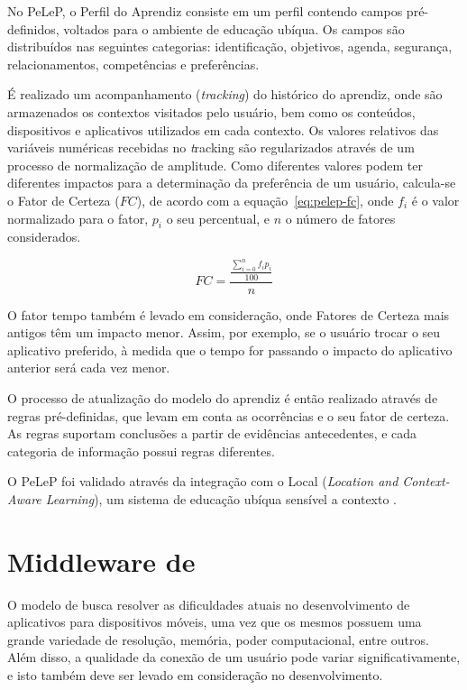 No PeLeP, o Perfil do Aprendiz consiste em um perfil contendo campos pré-definidos, voltados para o ambiente de educação ubíqua. Os campos são distribuídos nas seguintes categorias: identificação, objetivos, agenda, segurança, relacionamentos, competências e preferências. 

É realizado um acompanhamento ({\em tracking}) do histórico do aprendiz, onde são armazenados os contextos visitados pelo usuário, bem como os conteúdos, dispositivos e aplicativos utilizados em cada contexto. Os valores relativos das variáveis numéricas recebidas no {\emph tracking} são regularizados através de um processo de normalização de amplitude. Como diferentes valores podem ter diferentes impactos para a determinação da preferência de um usuário, calcula-se o Fator de Certeza ($FC$), de acordo com a equação~\ref{eq:pelep-fc}, onde $f_i$ é o valor normalizado para o fator, $p_i$ o seu percentual, e $n$ o número de fatores considerados.

\begin{equation}
  FC = \frac{\frac{\displaystyle\sum_{i=0}^n f_i p_i}{100}}{n}
  \label{eq:pelep-fc}
\end{equation}

O fator tempo também é levado em consideração, onde Fatores de Certeza mais antigos têm um impacto menor. Assim, por exemplo, se o usuário trocar o seu aplicativo preferido, à medida que o tempo for passando o impacto do aplicativo anterior será cada vez menor.

O processo de atualização do modelo do aprendiz é então realizado através de regras pré-definidas, que levam em conta as ocorrências e o seu fator de certeza. As regras suportam conclusões a partir de evidências antecedentes, e cada categoria de informação possui regras diferentes.

O PeLeP foi validado através da integração com o Local ({\em Location and Context-Aware Learning}), um sistema de educação ubíqua sensível a contexto \cite{barbosa11}.


\section{Middleware de }

O modelo de  busca resolver as dificuldades atuais no desenvolvimento de aplicativos para dispositivos móveis, uma vez que os mesmos possuem uma grande variedade de resolução, memória, poder computacional, entre outros. Além disso, a qualidade da conexão de um usuário pode variar significativamente, e isto também deve ser levado em consideração no desenvolvimento.

